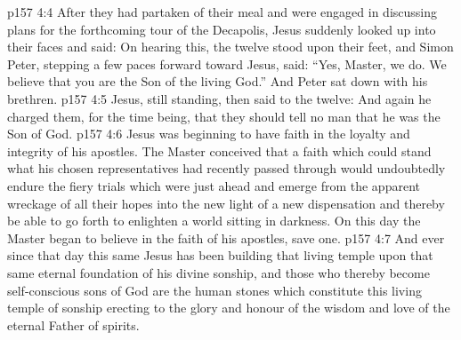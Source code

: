 \vs p157 4:4 After they had partaken of their meal and were engaged in discussing plans for the forthcoming tour of the Decapolis, Jesus suddenly looked up into their faces and said:  On hearing this, the twelve stood upon their feet, and Simon Peter, stepping a few paces forward toward Jesus, said: “Yes, Master, we do. We believe that you are the Son of the living God.” And Peter sat down with his brethren.
\vs p157 4:5 Jesus, still standing, then said to the twelve:  And again he charged them, for the time being, that they should tell no man that he was the Son of God.
\vs p157 4:6 \pc Jesus was beginning to have faith in the loyalty and integrity of his apostles. The Master conceived that a faith which could stand what his chosen representatives had recently passed through would undoubtedly endure the fiery trials which were just ahead and emerge from the apparent wreckage of all their hopes into the new light of a new dispensation and thereby be able to go forth to enlighten a world sitting in darkness. On this day the Master began to believe in the faith of his apostles, save one.
\vs p157 4:7 And ever since that day this same Jesus has been building that living temple upon that same eternal foundation of his divine sonship, and those who thereby become self\hyp{}conscious sons of God are the human stones which constitute this living temple of sonship erecting to the glory and honour of the wisdom and love of the eternal Father of spirits.
